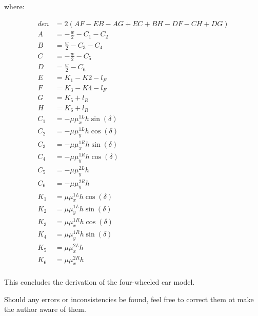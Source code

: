 \documentclass[paper=a4, fontsize=11pt]{scrartcl} %
\numberwithin{equation}{section} %
\numberwithin{figure}{section} %
\numberwithin{table}{section} %
\begin{document}
where:

\begin{align}
den &= 2(AF - EB - AG + EC + BH - DF - CH + DG) \\
A &= -\frac{w}{2} - C_1 - C_2 \\
B &= \frac{w}{2} - C_3 - C_4 \\
C &= -\frac{w}{2} - C_5 \\
D &= \frac{w}{2} - C_6 \\
E &= K_1 - K2 - l_F \\
F &= K_3 - K4 - l_F \\
G &= K_5 + l_R \\
H &= K_6 + l_R \\
C_1 &= -\mu \mu^{1L}_x h \sin(\delta) \\
C_2 &= -\mu \mu^{1L}_y h \cos(\delta) \\
C_3 &= -\mu \mu^{1R}_x h \sin(\delta) \\
C_4 &= -\mu \mu^{1R}_y h \cos(\delta) \\
C_5 &= -\mu \mu^{2L}_y h  \\
C_6 &= -\mu \mu^{2R}_y h  \\
K_1 &= \mu \mu^{1L}_x h \cos(\delta) \\
K_2 &= \mu \mu^{1L}_y h \sin(\delta) \\
K_3 &= \mu \mu^{1R}_x h \cos(\delta) \\
K_4 &= \mu \mu^{1R}_y h \sin(\delta) \\
K_5 &= \mu \mu^{2L}_x h \\
K_6 &= \mu \mu^{2R}_x h \\
\end{align}

This concludes the derivation of the four-wheeled car model.


Should any errors or inconsistencies be found, feel free to correct them ot make the author aware of them.



\end{document}
